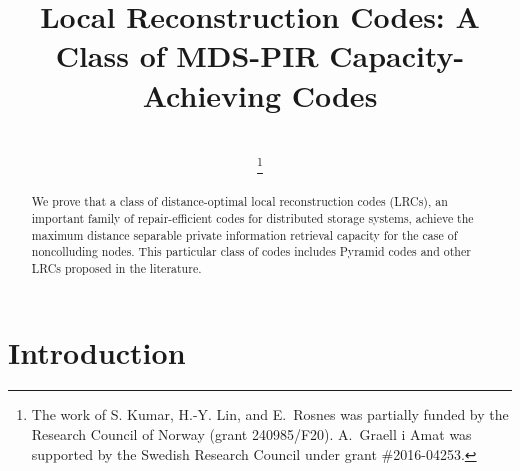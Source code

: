 \documentclass[twocolumn,conference]{IEEEtran}
\begin{document}
\title{Local Reconstruction Codes: A Class of MDS-PIR Capacity-Achieving Codes} %
\author{\\%
\vspace{-4mm}
\thanks{The work of S. Kumar, H.-Y. Lin, and E.\ Rosnes was partially funded by the Research Council of Norway (grant 240985/F20). A.\ Graell i Amat was supported by the Swedish Research Council under grant \#2016-04253.}}%



\maketitle

\begin{abstract}


We prove that a class of distance-optimal local reconstruction codes (LRCs), an important family of repair-efficient codes for distributed storage systems, achieve the maximum distance separable private information retrieval capacity for the case of noncolluding nodes. This particular class of codes includes Pyramid codes and other LRCs proposed in the literature.
\end{abstract}


\section{Introduction}
\end{document}
